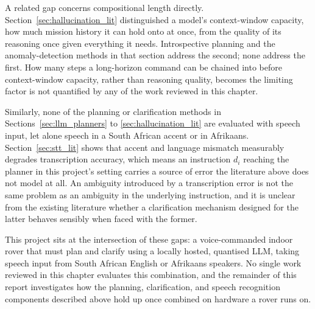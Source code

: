 A related gap concerns compositional length directly. Section~\ref{sec:hallucination_lit}
distinguished a model's context-window capacity, how much mission history it can hold onto at
once, from the quality of its reasoning once given everything it needs. Introspective planning
and the anomaly-detection methods in that section address the second; none address the first. How
many steps a long-horizon command can be chained into before context-window capacity, rather than
reasoning quality, becomes the limiting factor is not quantified by any of the work reviewed in
this chapter.

Similarly, none of the planning or clarification methods in Sections~\ref{sec:llm_planners} to \ref{sec:hallucination_lit} are evaluated with speech input, let alone speech in a South African accent or in Afrikaans. 
Section~\ref{sec:stt_lit} shows that accent and language mismatch measurably degrades transcription accuracy, which means an instruction $d_i$ reaching the planner in this project's setting carries a source of error the literature above does not model at all. 
An ambiguity introduced by a transcription error is not the same problem as an ambiguity in the underlying instruction, and it is unclear from the existing literature whether a clarification mechanism designed for the latter behaves sensibly when faced with the former.

This project sits at the intersection of these gaps: a voice-commanded indoor rover that must plan and clarify using a locally hosted, quantised LLM, 
taking speech input from South African English or Afrikaans speakers. No single work reviewed in this chapter evaluates this combination, and the remainder of this report investigates how the planning, clarification, and speech recognition 
components described above hold up once combined on hardware a rover runs on.
